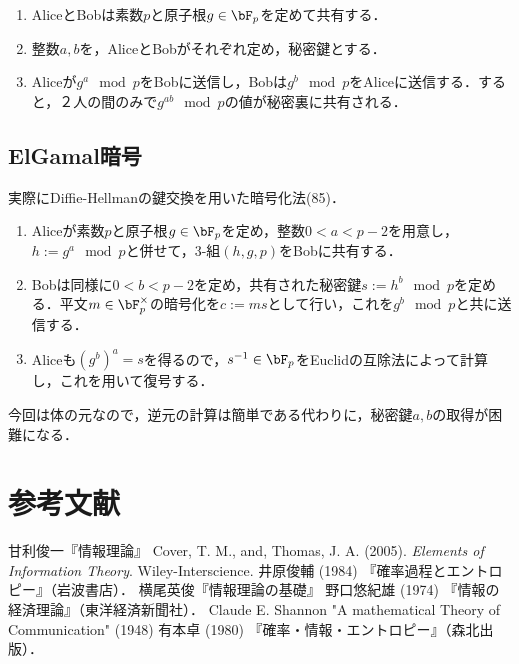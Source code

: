 \documentclass[uplatex,dvipdfmx]{jsreport}
\begin{document}
\begin{definition}\mbox{}
    \begin{enumerate}
        \item AliceとBobは素数$p$と原子根$g\in\bF_p$を定めて共有する．
        \item 整数$a,b$を，AliceとBobがそれぞれ定め，秘密鍵とする．
        \item Aliceが$g^a\mod p$をBobに送信し，Bobは$g^b\mod p$をAliceに送信する．すると，２人の間のみで$g^{ab}\mod p$の値が秘密裏に共有される．
    \end{enumerate}
\end{definition}

\section{ElGamal暗号}

\begin{tcolorbox}[colframe=ForestGreen, colback=ForestGreen!10!white,breakable,colbacktitle=ForestGreen!40!white,coltitle=black,fonttitle=\bfseries\sffamily,
title=]
    実際にDiffie-Hellmanの鍵交換を用いた暗号化法(85)．
\end{tcolorbox}

\begin{definition}\mbox{}
    \begin{enumerate}
        \item Aliceが素数$p$と原子根$g\in\bF_p$を定め，整数$0<a<p-2$を用意し，$h:=g^a\mod p$と併せて，3-組$(h,g,p)$をBobに共有する．
        \item Bobは同様に$0<b<p-2$を定め，共有された秘密鍵$s:=h^b\mod p$を定める．平文$m\in\bF^\times_p$の暗号化を$c:=ms$として行い，これを$g^b\mod p$と共に送信する．
        \item Aliceも$(g^b)^a=s$を得るので，$s^{-1}\in\bF_p$をEuclidの互除法によって計算し，これを用いて復号する．
    \end{enumerate}
\end{definition}
\begin{remarks}
    今回は体の元なので，逆元の計算は簡単である代わりに，秘密鍵$a,b$の取得が困難になる．
\end{remarks}

\chapter{参考文献}

\begin{thebibliography}{99}
    甘利俊一『情報理論』
    Cover, T. M., and, Thomas, J. A. (2005). \textit{Elements of Information Theory}. Wiley-Interscience.
    井原俊輔 (1984) 『確率過程とエントロピー』（岩波書店）．
    横尾英俊『情報理論の基礎』
    野口悠紀雄 (1974) 『情報の経済理論』（東洋経済新聞社）．
    Claude E. Shannon "A mathematical Theory of Communication" (1948)
    有本卓 (1980) 『確率・情報・エントロピー』（森北出版）．
\end{thebibliography}
\end{document}
